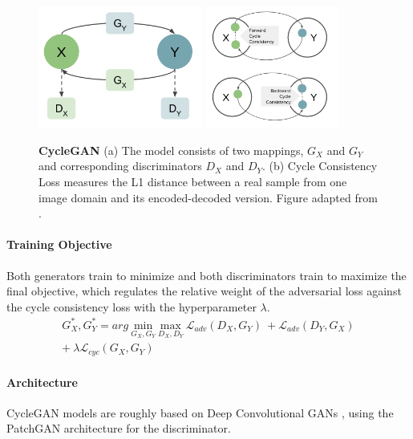 \documentclass[12pt]{report}
\begin{document}
\begin{figure}[t]
\centering
{}
{\includegraphics[height=4cm]{03_analysis/gans/cyclegan1}}\hspace{1cm}
{\includegraphics[height=4cm]{03_analysis/gans/cyclegan2}}
\caption{\label{fig:cyclegan} \textbf{CycleGAN} (a) The model consists of two mappings, $G_{X}$ and $G_{Y}$ and corresponding discriminators $D_{X}$ and $D_{Y}$. (b) Cycle Consistency Loss measures the L1 distance between a real sample from one image domain and its encoded-decoded version. Figure adapted from \cite{zhu_unpaired_2017}.}
\end{figure}


\paragraph{Training Objective}
Both generators train to minimize and both discriminators train to maximize the final objective, which regulates the relative weight of the adversarial loss against the cycle consistency loss with the hyperparameter $\lambda$.
\begin{equation}
\begin{split}
G^{*}_{X}, G^{*}_{Y} = arg \ \underset{G_{X}, G_{Y}}{\mathrm{min}} \ \underset{D_{X}, D_{Y}}{\mathrm{max}} \ \mathcal{L}_{adv}(D_{X},G_{Y}) \ +  \mathcal{L}_{adv}(D_{Y}, G_{X}) \\ + \ \lambda \mathcal{L}_{cyc}(G_{X}, G_{Y})
\end{split}
\end{equation}

\paragraph{Architecture}
CycleGAN models are roughly based on Deep Convolutional GANs \cite{radford_unsupervised_2015}, using the PatchGAN architecture \cite{isola_image--image_2016} for the discriminator.
\end{document}
